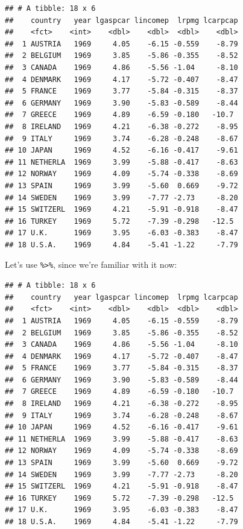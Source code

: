 \documentclass[]{gitbook}
\newenvironment{Shaded}{\begin{snugshade}}{\end{snugshade}}
\newcommand{\DecValTok}[1]{\textcolor[rgb]{0.00,0.00,0.81}{#1}}
\newcommand{\KeywordTok}[1]{\textcolor[rgb]{0.13,0.29,0.53}{\textbf{#1}}}
\newcommand{\NormalTok}[1]{#1}
\newcommand{\OperatorTok}[1]{\textcolor[rgb]{0.81,0.36,0.00}{\textbf{#1}}}
\newcommand{\StringTok}[1]{\textcolor[rgb]{0.31,0.60,0.02}{#1}}
\theoremstyle{definition}
\theoremstyle{definition}
\theoremstyle{definition}
\theoremstyle{remark}
\begin{document}
\begin{verbatim}
## # A tibble: 18 x 6
##    country   year lgaspcar lincomep  lrpmg lcarpcap
##    <fct>    <int>    <dbl>    <dbl>  <dbl>    <dbl>
##  1 AUSTRIA   1969     4.05    -6.15 -0.559    -8.79
##  2 BELGIUM   1969     3.85    -5.86 -0.355    -8.52
##  3 CANADA    1969     4.86    -5.56 -1.04     -8.10
##  4 DENMARK   1969     4.17    -5.72 -0.407    -8.47
##  5 FRANCE    1969     3.77    -5.84 -0.315    -8.37
##  6 GERMANY   1969     3.90    -5.83 -0.589    -8.44
##  7 GREECE    1969     4.89    -6.59 -0.180   -10.7 
##  8 IRELAND   1969     4.21    -6.38 -0.272    -8.95
##  9 ITALY     1969     3.74    -6.28 -0.248    -8.67
## 10 JAPAN     1969     4.52    -6.16 -0.417    -9.61
## 11 NETHERLA  1969     3.99    -5.88 -0.417    -8.63
## 12 NORWAY    1969     4.09    -5.74 -0.338    -8.69
## 13 SPAIN     1969     3.99    -5.60  0.669    -9.72
## 14 SWEDEN    1969     3.99    -7.77 -2.73     -8.20
## 15 SWITZERL  1969     4.21    -5.91 -0.918    -8.47
## 16 TURKEY    1969     5.72    -7.39 -0.298   -12.5 
## 17 U.K.      1969     3.95    -6.03 -0.383    -8.47
## 18 U.S.A.    1969     4.84    -5.41 -1.22     -7.79
\end{verbatim}

Let's use \texttt{\%\textgreater{}\%}, since we're familiar with it now:

\begin{Shaded}
\end{Shaded}

\begin{verbatim}
## # A tibble: 18 x 6
##    country   year lgaspcar lincomep  lrpmg lcarpcap
##    <fct>    <int>    <dbl>    <dbl>  <dbl>    <dbl>
##  1 AUSTRIA   1969     4.05    -6.15 -0.559    -8.79
##  2 BELGIUM   1969     3.85    -5.86 -0.355    -8.52
##  3 CANADA    1969     4.86    -5.56 -1.04     -8.10
##  4 DENMARK   1969     4.17    -5.72 -0.407    -8.47
##  5 FRANCE    1969     3.77    -5.84 -0.315    -8.37
##  6 GERMANY   1969     3.90    -5.83 -0.589    -8.44
##  7 GREECE    1969     4.89    -6.59 -0.180   -10.7 
##  8 IRELAND   1969     4.21    -6.38 -0.272    -8.95
##  9 ITALY     1969     3.74    -6.28 -0.248    -8.67
## 10 JAPAN     1969     4.52    -6.16 -0.417    -9.61
## 11 NETHERLA  1969     3.99    -5.88 -0.417    -8.63
## 12 NORWAY    1969     4.09    -5.74 -0.338    -8.69
## 13 SPAIN     1969     3.99    -5.60  0.669    -9.72
## 14 SWEDEN    1969     3.99    -7.77 -2.73     -8.20
## 15 SWITZERL  1969     4.21    -5.91 -0.918    -8.47
## 16 TURKEY    1969     5.72    -7.39 -0.298   -12.5 
## 17 U.K.      1969     3.95    -6.03 -0.383    -8.47
## 18 U.S.A.    1969     4.84    -5.41 -1.22     -7.79
\end{verbatim}
\end{document}
